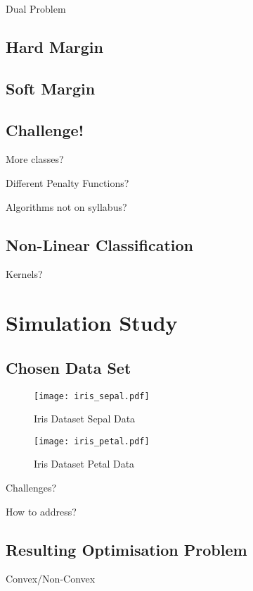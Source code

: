 \documentclass[10pt, a4paper]{amsart}
\begin{document}
Dual Problem

\subsection{Hard Margin}

\subsection{Soft Margin}

\subsection{Challenge!}\hfill

More classes?

Different Penalty Functions?

Algorithms not on syllabus?

\subsection{Non-Linear Classification}\hfill

Kernels?


\section{Simulation Study}

\subsection{Chosen Data Set}\hfill

\begin{figure}
	\centering	
	\texttt{[image: iris\_sepal.pdf]}
	\caption{Iris Dataset Sepal Data}
\end{figure}

\begin{figure}
	\centering	
	\texttt{[image: iris\_petal.pdf]}
	\caption{Iris Dataset Petal Data}
\end{figure}

Challenges?

How to address?

\subsection{Resulting Optimisation Problem}\hfill

Convex/Non-Convex
\end{document}
